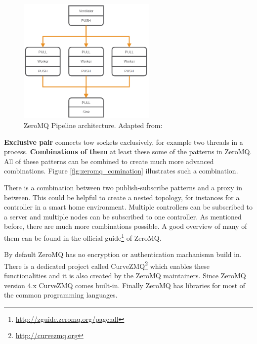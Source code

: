 \begin{figure}[H]
    \centering
    \includegraphics[width=0.6\textwidth]{resources/images/zeromq-vernitlator.png}
    \caption[ZeroMQ Pipeline architecture]{ZeroMQ Pipeline architecture. Adapted from: \autocite{ZeroMQ:Guide}}
    \label{fig:zeromq_pipeline}
\end{figure}

\textbf{Exclusive pair} connects tow sockets exclusively, for example two threads in a process.\autocite{ZeroMQ:Guide}
\newline
\textbf{Combinations of them} at least these some of the patterns in ZeroMQ.
All of these patterns can be combined to create much more advanced combinations.
Figure \ref{fig:zeromq_comination} illustrates such a combination.\newline

There is a combination between two publish-subscribe patterns and a proxy in between.
This could be helpful to create a nested topology, for instances for a controller in a smart home environment.
Multiple controllers can be subscribed to a server and multiple nodes can be subscribed to one controller.
As mentioned before, there are much more combinations possible.
A good overview of many of them can be found in the official guide\footnote{\url{http://zguide.zeromq.org/page:all}} of ZeroMQ.\newline

By default ZeroMQ has no encryption or authentication machanismn build in.
There is a dedicated project called CurveZMQ\footnote{\url{http://curvezmq.org}} which enables these functionalities and it is also created by the ZeroMQ maintainers.
Since ZeroMQ version 4.x CurveZMQ comes built-in.
Finally ZeroMQ has libraries for most of the common programming languages.\newline

